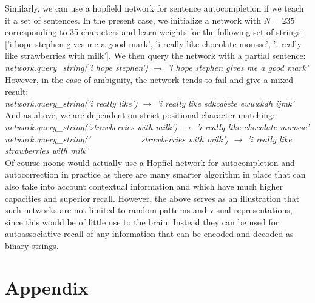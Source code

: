 \documentclass{article}
\begin{document}
Similarly, we can use a hopfield network for sentence autocompletion if we teach it a set of sentences. In the present case, we initialize a network with $N=235$ corresponding to 35 characters and learn weights for the following set of strings: ['i hope stephen gives me a good mark', 'i really like chocolate mousse', 'i really like strawberries with milk'].
We then query the network with a partial sentence:\\
\textit{network.query\_string('i hope stephen') $\rightarrow$ 'i hope stephen gives me a good mark'}\\

However, in the case of ambiguity, the network tends to fail and give a mixed result:\\
\textit{network.query\_string('i really like') $\rightarrow$ 'i really like sdkcgbete ewuwkdh ijmk'}\\

And as above, we are dependent on strict positional character matching:\\
\textit{network.query\_string('strawberries with milk') $\rightarrow$ 'i really like chocolate mousse'}\\
\textit{network.query\_string('\,\,\,\,\,\,\,\,\,\,\,\,\,\,\,\,\,\,\,\,\,\,\,\,\,\,\,\,\,\,\,\,\,\, strawberries with milk') $\rightarrow$ 'i really like strawberries with milk'}\\

Of course noone would actually use a Hopfiel network for  autocompletion and autocorrection in practice as there are many smarter algorithm in place that can also take into account contextual information and which have much higher capacities and superior recall. However, the above serves as an illustration that such networks are not limited to random patterns and visual representations, since this would be of little use to the brain. Instead they can be used for autoassociative recall of any information that can be encoded and decoded as binary strings.

\section*{Appendix}


\end{document}
